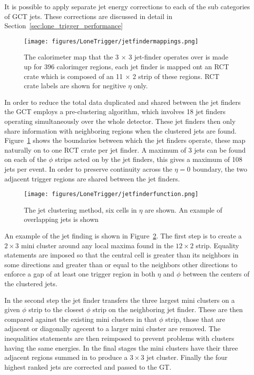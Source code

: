 It is possible to apply separate jet energy corrections to each of the sub 
categories of GCT jets. These corrections are discussed in detail in 
Section~\ref{sec:lone_trigger_performance}

\begin{figure}[ht]
  \centering    
  \texttt{[image: figures/LoneTrigger/jetfindermappings.png]}
  \caption{The calorimeter map that the 3 $\times$ 3 jet-finder operates over
   is made up for 396 calorimger regions, each jet finder is mapped ont an RCT
    crate which is composed of an 11 $\times$ 2 strip of these regions. RCT
    crate labels are shown for negitive $\eta$ only. }
  \label{fig:figures_LoneTrigger_jetfindermappings}
\end{figure}

In order to reduce the total data duplicated and shared between the jet finders
the GCT employs a pre-clustering algorithm, which involves 18 jet finders 
operating simultaneously over the whole detector. These jet finders then only
share information with neighboring regions when the clustered jets are found.
Figure~\ref{fig:figures_LoneTrigger_jetfindermappings} shows the boundaries 
between which the jet finders operate, these map naturally on to one RCT crate 
per jet finder. A maximum of 3 jets can be found on each of the $\phi$ strips
acted on by the jet finders, this gives a maximum of 108 jets per event. In
order to preserve continuity across the $\eta = 0$ boundary, the two adjacent
trigger regions are shared between the jet finders.


\begin{figure}[ht]
  \centering
 \texttt{[image: figures/LoneTrigger/jetfinderfunction.png]}
  \caption{The \Lone jet clustering method, six cells in $\eta$ are shown. An
  example of overlapping jets is shown}
  \label{fig:figures_LoneTrigger_jetfinderfunction}
\end{figure}


An example of the jet finding is shown in
Figure~\ref{fig:figures_LoneTrigger_jetfinderfunction}. The first step is to 
create a $2 \times 3$ mini cluster around any local maxima found in the $12 
\times 2$ strip. Equality statements are imposed so that the central cell is 
greater than its neighbors in some directions and greater than or equal to the 
neighbors other directions to enforce a gap of at least one trigger region in 
both $\eta$ and $\phi$ between the centers of the clustered jets.

In the second step the jet finder transfers the three largest mini clusters on 
a given $\phi$ strip to the closest $\phi$ strip on the neighboring jet finder.
These are then compared against the existing mini clusters in that $\phi$ strip,
those that are adjacent or diagonally agecent to a larger mini cluster are 
removed. The inequalities statements are then reimposed to prevent problems
with clusters having the same energies. In the final stages the mini clusters
have their three adjacent regions summed in to produce a $3 \times 3$ jet
cluster. Finally the four highest ranked jets are corrected and passed to the 
GT.




